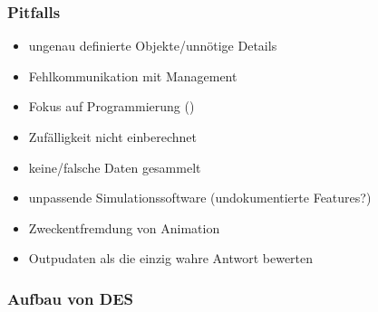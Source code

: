 \documentclass[nonacm=true, language=german]{acmart}
\begin{document}
\subsubsection{Pitfalls}

\begin{itemize}
    \item ungenau definierte Objekte/unnötige Details
    \item Fehlkommunikation mit Management
    \item Fokus auf Programmierung ()
    \item Zufälligkeit nicht einberechnet
    \item keine/falsche Daten gesammelt
    \item unpassende Simulationssoftware (undokumentierte Features?)
    \item Zweckentfremdung von Animation
    \item Outpudaten als die einzig wahre Antwort bewerten
\end{itemize}

\subsubsection{Aufbau von \ac{DES}}

\text{}
\end{document}
